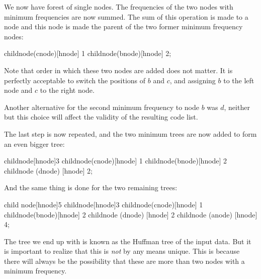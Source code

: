 \begin{huffmanc}
\end{huffmanc}

We now have forest of single nodes. The frequencies of the two nodes
with minimum frequencies are now summed. The sum of this operation is
made to a node and this node is made the parent of the two former
minimum frequency nodes:

\begin{huffmanc}
  child{node(cnode)[hnode] {1}}
  child{node(bnode)[hnode] {2}};
\end{huffmanc}

Note that order in which these two nodes are added does not matter. It
is perfectly acceptable to switch the positions of $b$ and $c$, and
assigning $b$ to the left node and $c$ to the right node.

Another alternative for the second minimum frequency to node $b$ was
$d$, neither but this choice will affect the validity of the resulting
code list.

The last step is now repeated, and the two minimum trees are now added
to form an even bigger tree:

\begin{huffmanc}
  child{node[hnode]{3}
    child{node(cnode)[hnode] {1}}
    child{node(bnode)[hnode] {2}}}
  child{node (dnode) [hnode] {2}};


\end{huffmanc}

And the same thing is done for the two remaining trees:

\begin{huffmanc}
  child {node[hnode]{5}
    child{node[hnode]{3}
      child{node(cnode)[hnode] {1}}
      child{node(bnode)[hnode] {2}}}
    child{node (dnode) [hnode] {2}}}
  child{node (anode) [hnode] {4}};

\end{huffmanc}

The tree we end up with is known as the Huffman tree of the input
data. But it is important to realize that this is \textit{not} by any
means unique. This is because there will always be the possibility
that these are more than two nodes with a minimum frequency.


